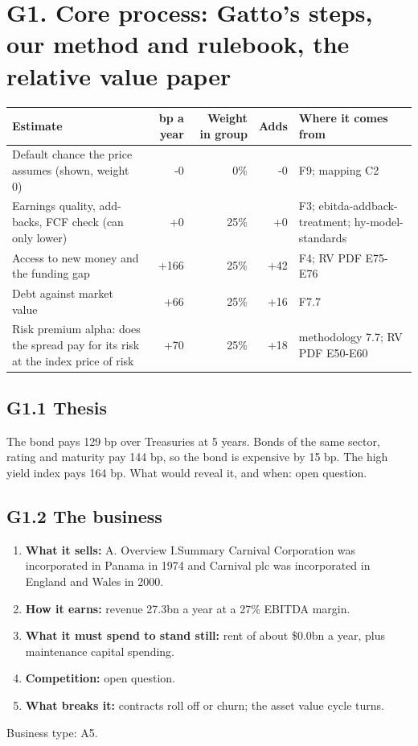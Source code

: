 \documentclass[11pt,a4paper]{article}
\begin{document}
\section*{G1. Core process: Gatto's steps, our method and rulebook, the relative value paper}
\par\noindent{}
\begin{center}\footnotesize\setlength{\tabcolsep}{3.5pt}\begin{tabular}{@{}p{6.2cm}rrrp{4.2cm}@{}}\toprule
Estimate & bp a year & Weight in group & Adds & Where it comes from \\\midrule
Default chance the price assumes (shown, weight 0) & -0 & 0\% & -0 & F9; mapping C2 \\
Earnings quality, add-backs, FCF check (can only lower) & +0 & 25\% & +0 & F3; ebitda-addback-treatment; hy-model-standards \\
Access to new money and the funding gap & +166 & 25\% & +42 & F4; RV PDF E75-E76 \\
Debt against market value & +66 & 25\% & +16 & F7.7 \\
Risk premium alpha: does the spread pay for its risk at the index price of risk & +70 & 25\% & +18 & methodology 7.7; RV PDF E50-E60 \\
\bottomrule\end{tabular}\end{center}
\subsection*{G1.1 Thesis}
The bond pays 129 bp over Treasuries at 5 years. Bonds of the same sector, rating and maturity pay 144 bp, so the bond is expensive by 15 bp. The high yield index pays 164 bp. What would reveal it, and when: open question.
\subsection*{G1.2 The business}
\begin{enumerate}
\item \textbf{What it sells:} A. Overview I.Summary Carnival Corporation was incorporated in Panama in 1974 and Carnival plc was incorporated in England and Wales in 2000.
\item \textbf{How it earns:} revenue 27.3bn a year at a 27\% EBITDA margin.
\item \textbf{What it must spend to stand still:} rent of about \$0.0bn a year, plus maintenance capital spending.
\item \textbf{Competition:} open question.
\item \textbf{What breaks it:} contracts roll off or churn; the asset value cycle turns.
\end{enumerate}
Business type: A5.
\end{document}
